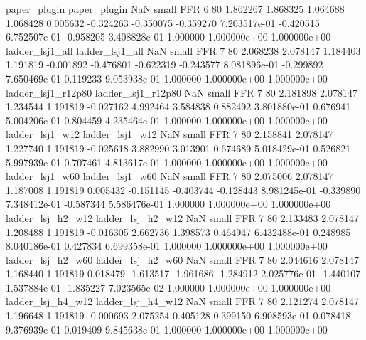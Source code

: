             paper_plugin             paper_plugin                   NaN      small      FFR                 6 80 1.862267       1.868325 1.064688       1.068428    0.005632     -0.324263     -0.350075    -0.359270   7.203517e-01 -0.420515 6.752507e-01    -0.958205   3.408828e-01            1.000000    1.000000e+00        1.000000e+00
         ladder_lsj1_all          ladder_lsj1_all                   NaN      small      FFR                 7 80 2.068238       2.078147 1.184403       1.191819   -0.001892     -0.476801     -0.622319    -0.243577   8.081896e-01 -0.299892 7.650469e-01     0.119233   9.053938e-01            1.000000    1.000000e+00        1.000000e+00
      ladder_lsj1_r12p80       ladder_lsj1_r12p80                   NaN      small      FFR                 7 80 2.181898       2.078147 1.234544       1.191819   -0.027162      4.992464      3.584838     0.882492   3.801880e-01  0.676941 5.004206e-01     0.804459   4.235464e-01            1.000000    1.000000e+00        1.000000e+00
         ladder_lsj1_w12          ladder_lsj1_w12                   NaN      small      FFR                 7 80 2.158841       2.078147 1.227740       1.191819   -0.025618      3.882990      3.013901     0.674689   5.018429e-01  0.526821 5.997939e-01     0.707461   4.813617e-01            1.000000    1.000000e+00        1.000000e+00
         ladder_lsj1_w60          ladder_lsj1_w60                   NaN      small      FFR                 7 80 2.075006       2.078147 1.187008       1.191819    0.005432     -0.151145     -0.403744    -0.128443   8.981245e-01 -0.339890 7.348412e-01    -0.587344   5.586476e-01            1.000000    1.000000e+00        1.000000e+00
       ladder_lsj_h2_w12        ladder_lsj_h2_w12                   NaN      small      FFR                 7 80 2.133483       2.078147 1.208488       1.191819   -0.016305      2.662736      1.398573     0.464947   6.432488e-01  0.248985 8.040186e-01     0.427834   6.699358e-01            1.000000    1.000000e+00        1.000000e+00
       ladder_lsj_h2_w60        ladder_lsj_h2_w60                   NaN      small      FFR                 7 80 2.044616       2.078147 1.168440       1.191819    0.018479     -1.613517     -1.961686    -1.284912   2.025776e-01 -1.440107 1.537884e-01    -1.835227   7.023565e-02            1.000000    1.000000e+00        1.000000e+00
       ladder_lsj_h4_w12        ladder_lsj_h4_w12                   NaN      small      FFR                 7 80 2.121274       2.078147 1.196648       1.191819   -0.000693      2.075254      0.405128     0.399150   6.908593e-01  0.078418 9.376939e-01     0.019409   9.845638e-01            1.000000    1.000000e+00        1.000000e+00
